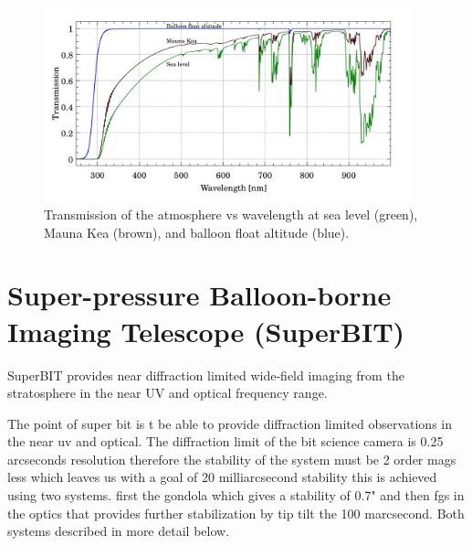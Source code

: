 \begin{figure}
    \begin{small}
        \begin{center}
            \includegraphics[width=0.95\textwidth]{Introduction/figs/atmosphere.jpg}
        \end{center}
        \caption{Transmission of the atmosphere vs wavelength at sea level (green), Mauna Kea (brown), and balloon float altitude (blue). }
        \label{fig:atmos}
    \end{small}
\end{figure}


\section{Super-pressure Balloon-borne Imaging Telescope (SuperBIT)}
SuperBIT provides near diffraction limited wide-field imaging from the stratosphere in the near UV and optical frequency range.  

The point of super bit is t be able to provide diffraction limited observations in the near uv and optical. The diffraction limit of the bit science camera is 0.25 arcseconds resolution therefore the stability of the system must be 2 order mags less which leaves us with a goal of 20 milliarcsecond stability this is achieved using two systems. first the gondola which gives a stability of 0.7" and then fgs in the optics that provides further stabilization by tip tilt the 100 marcsecond. Both systems described in more detail below.

